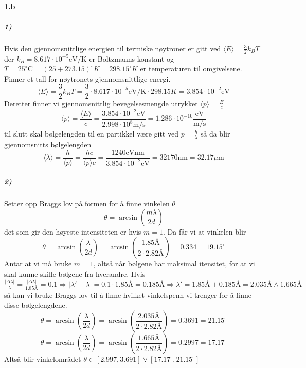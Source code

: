 \documentclass[11pt, A4paper,norsk]{article}
\begin{document}
		\paragraph{1.b}
			\subparagraph{1)}
				\begin{flushleft}
Hvis den gjennomsnittlige energien til termiske nøytroner er gitt ved $\langle E \rangle = \frac{3}{2} k_B T$ der $k_B = 8.617 \cdot 10^{-5} \text{eV}/\text{K}$ er Boltzmanns konstant og $T = 25^{\circ}\text{C} = ( 25 + 273.15 )^{\circ} K = 298.15^{\circ} K$ er temperaturen til omgivelsene. Finner et tall for nøytronets gjennomsnittlige energi.
$$\langle E \rangle = \frac{3}{2} k_B T = \frac{3}{2} \cdot 8.617 \cdot 10^{-5} \text{eV}/\text{K} \cdot 298.15 K = 3.854 \cdot 10^{- 2} \text{eV}$$
Deretter finner vi gjennomsnittlig bevegelsesmengde utrykket $\langle p \rangle = \frac{E}{c}$
$$\langle p \rangle = \frac{\langle E \rangle}{c} = \frac{3.854 \cdot 10^{- 2} \text{eV}}{2.998 \cdot 10^{8} \text{m} / \text{s}} = 1.286 \cdot 10^{-10} \frac{\text{eV}}{\text{m} / \text{s}}$$
til slutt skal bølgelengden til en partikkel være gitt ved $p = \frac{h}{\lambda}$ så da blir gjennomsnitts bølgelengden
$$\langle \lambda \rangle = \frac{h}{\langle p \rangle} = \frac{h c}{\langle p \rangle c} = \frac{1240 \text{eV} \text{nm}}{3.854 \cdot 10^{- 2} \text{eV}} = 32170 \text{nm} = 32.17 \mu \text{m}$$
				\end{flushleft}










			\subparagraph{2)}
				\begin{flushleft}
Setter opp Braggs lov på formen for å finne vinkelen $\theta$
$$\theta = \arcsin \left( \frac{m \lambda}{2 d} \right)$$
det som gir den høyeste intensiteten er hvis $m = 1$. Da får vi at vinkelen blir
$$\theta = \arcsin\left( \frac{\lambda}{2 d} \right) = \arcsin\left( \frac{1.85 \text{Å}}{2 \cdot 2.82 \text{Å}} \right) = 0.334 = 19.15^{\circ}$$
Antar at vi må bruke $m = 1$, altså når bølgene har maksimal itensitet, for at vi skal kunne skille bølgene fra hverandre.
Hvis $\frac{|\Delta \lambda|}{\lambda} = \frac{|\Delta \lambda|}{1.85 \text{Å}} = 0.1 \Rightarrow |\lambda' - \lambda| = 0.1 \cdot 1.85 \text{Å} = 0.185 \text{Å} \Rightarrow \lambda' = 1.85 \text{Å} \pm 0.185 \text{Å} = 2.035 \text{Å} \wedge 1.665 \text{Å}$ så kan vi bruke Braggs lov til å finne hvilket vinkelspenn vi trenger for å finne disse bølgelengdene.
$$\theta = \arcsin\left( \frac{\lambda}{2 d} \right) = \arcsin\left( \frac{2.035 \text{Å}}{2 \cdot 2.82 \text{Å}} \right) = 0.3691 = 21.15^{\circ}$$
$$\theta = \arcsin\left( \frac{\lambda}{2 d} \right) = \arcsin\left( \frac{1.665 \text{Å}}{2 \cdot 2.82 \text{Å}} \right) = 0.2997 = 17.17^{\circ}$$
Altså blir vinkelområdet $\theta \in [2.997, 3.691] \vee [17.17^{\circ}, 21.15^{\circ}]$
				\end{flushleft}
\end{document}
